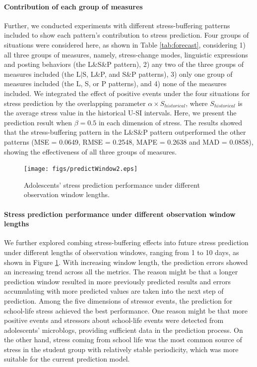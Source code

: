 \paragraph{Contribution of each group of measures}
Further,
we conducted experiments with different stress-buffering patterns included to show each pattern's contribution to stress prediction.
Four groups of situations were considered here, as shown in Table \ref{tab:forecast},
considering
1) all three groups of measures, namely, stress-change modes, linguistic expressions and posting behaviors (the L\&S\&P pattern),
2) any two of the three groups of measures included (the L$|$S, L\&P, and S\&P patterns),
3) only one group of measures included (the L, S, or P patterns),
and 4) none of the measures included.
We integrated the effect of positive events under the four situations for stress prediction
by the overlapping parameter $\alpha \times S_{historical}$,
where $S_{historical}$ is the average stress value in the historical U-SI intervals.
Here, we present the prediction result when $\beta = 0.5$ in each dimension of stress.
The results showed that the stress-buffering pattern in the L\&S\&P pattern outperformed the other patterns
(MSE = 0.0649, RMSE = 0.2548, MAPE = 0.2638 and MAD = 0.0858),
showing the effectiveness of all three groups of measures.
\begin{figure}
\centering
\caption{\small{Adolescents' stress prediction performance under different observation window lengths.}}
\texttt{[image: figs/predictWindow2.eps]}
\label{fig:length}
\end{figure}

\paragraph{Stress prediction performance under different observation window lengths}
We further explored combing stress-buffering effects into future stress prediction under different lengths of observation windows,
ranging from 1 to 10 days, as shown in Figure \ref{fig:length}.
With increasing window length,
the prediction errors showed an increasing trend across all the metrics.
The reason might be that a longer prediction window resulted in more previously predicted results
and errors accumulating with more predicted values are taken into the next step of prediction.
Among the five dimensions of stressor events,
the prediction for school-life stress achieved the best performance.
One reason might be that more positive events and stressors about school-life events were detected from adolescents' microblogs,
providing sufficient data in the prediction process.
On the other hand,
stress coming from school life was the most common source of stress in the student group with relatively stable periodicity,
which was more suitable for the current prediction model.


